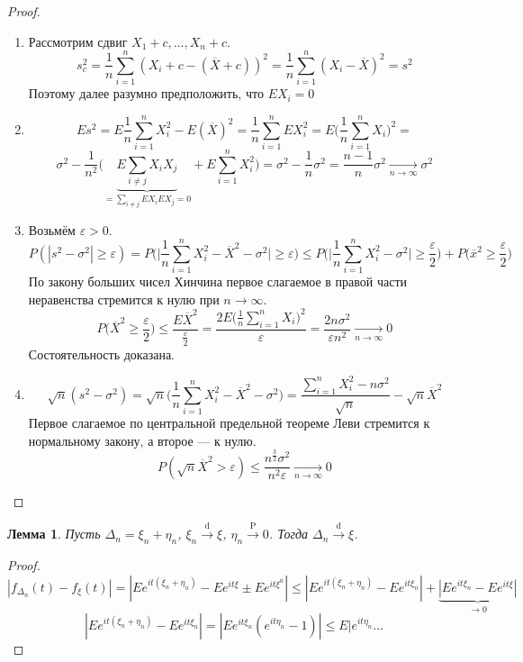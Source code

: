 \documentclass[11pt,openany,a4paper]{scrartcl}
\theoremstyle{plain}
\newtheorem{lemma}[theorem]{Лемма}
\theoremstyle{definition}
\newcommand{\underto}[1]{\xrightarrow[#1]{}}
\newcommand{\overto}[1]{\xrightarrow{#1}}
\newcommand{\ol}{\overline}
\begin{document}
\begin{proof}
\mbox{}
    \begin{enumerate}
        \item Рассмотрим сдвиг $X_1 + c, \ldots, X_n + c$.
        $$
        s_c^2 = \frac{1}{n}\sum\limits_{i=1}^n(X_i + c - (\ol X + c))^2 =
        \frac{1}{n}\sum\limits_{i=1}^n(X_i - \ol X)^2 = s^2
        $$
        Поэтому далее разумно предположить, что $EX_i = 0$
        \item
        $$
        Es^2 = E\frac{1}{n}\sum\limits_{i=1}^n X_i^2 - E(\ol X)^2 =
        \frac{1}{n}\sum\limits_{i=1}^n EX_i^2 =
        E\bigg(\frac{1}{n}\sum\limits_{i=1}^n X_i\bigg)^2 =
        $$
        $$
        \sigma^2 - \frac{1}{n^2} \bigg(\underbrace{E\sum\limits_{i \neq j}X_iX_j}_
        {= \sum\limits_{i \neq j} EX_iEX_j = 0} +
        E\sum\limits_{i=1}^n X_i^2\bigg) = \sigma^2 - \frac{1}{n}\sigma^2 =
        \frac{n - 1}{n}\sigma ^2 \underto{n \to \infty} \sigma^2
        $$
        \item Возьмём $\varepsilon > 0$.
        $$
        P(|s^2 - \sigma^2| \geqslant \varepsilon) =
        P\bigg(\bigg|\frac{1}{n}\sum\limits_{i=1}^n X_i^2 - \ol X^2 - \sigma^2\bigg|
        \geqslant \varepsilon \bigg) \leqslant
        P\bigg(\bigg|\frac{1}{n}\sum\limits_{i=1}^n X_i^2 - \sigma^2\bigg|
        \geqslant \frac{\varepsilon}{2} \bigg) +
        P\bigg(\ol x^2 \geqslant \frac{\varepsilon}{2}\bigg)
        $$
        По закону больших чисел Хинчина первое слагаемое в правой части неравенства стремится
        к нулю при $n \to \infty$.
        $$
        P\bigg(\ol X^2 \geqslant \frac{\varepsilon}{2}\bigg) \leqslant
        \frac{E \ol X^2}{\frac{\varepsilon}{2}} =
        \frac{2E\bigg(\frac{1}{n}\sum\limits_{i=1}^n X_i\bigg)^2}{\varepsilon} =
        \frac{2n\sigma^2}{\varepsilon n^2} \underto{n \to \infty} 0
        $$
        Состоятельность доказана.
        \item
        $$
        \sqrt{n}(s^2 - \sigma^2) =
        \sqrt{n}\bigg(\frac{1}{n} \sum\limits_{i=1}^n X_i^2 - \ol X^2 - \sigma^2\bigg) =
        \frac{\sum\limits_{i=1}^n X_i^2 - n\sigma^2}{\sqrt n} - \sqrt{n}\ol X^2
        $$
        Первое слагаемое по центральной предельной теореме Леви стремится к нормальному
        закону, а второе — к нулю.
        $$
        P(\sqrt n \ol X^2 > \varepsilon) \leqslant
        \frac{n^{\frac{3}{2}}\sigma^2}{n^2\varepsilon} \underto{n \to \infty} 0
        $$
    \end{enumerate}
\end{proof}
\begin{lemma}
    Пусть $\Delta_n = \xi_n + \eta_n$, $\xi_n \overto{\mathrm d} \xi$,
    $\eta_n \overto{\mathrm P} 0$. Тогда $\Delta_n \overto{\mathrm d} \xi$.
\end{lemma}
\begin{proof}
    $$
    |f_{\Delta_n}(t) - f_\xi(t)| = |Ee^{it(\xi_n + \eta_n)} - Ee^{it\xi} \pm Ee^{it\xi^n}|
    \leqslant |Ee^{it(\xi_n + \eta_n)} - Ee^{it\xi_n}| +
    \underbrace{|Ee^{it\xi_n} - Ee^{it\xi}|}_{\to 0}
    $$
    $$
    |Ee^{it(\xi_n + \eta_n)} - Ee^{it\xi_n}| = |Ee^{it\xi_n}(e^{it\eta_n} - 1)| \leqslant
    E|e^{it\eta_n} \ldots
    $$
\end{proof}
\end{document}
